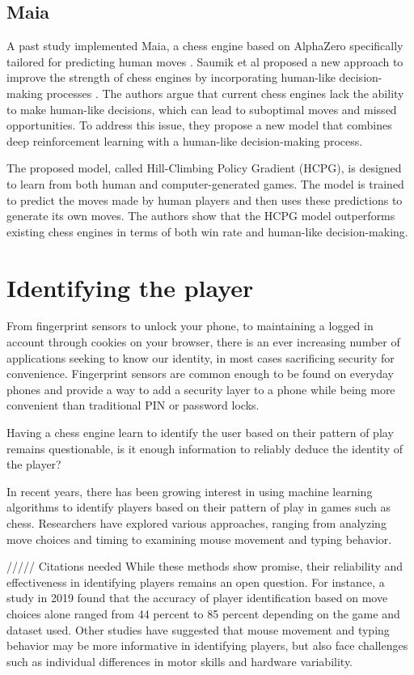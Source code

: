 \begin{spacing}{2.0}
\subsection{Maia}

A past study implemented Maia, a chess engine based on AlphaZero specifically tailored for predicting human moves \cite{SuperAI}. Saumik et al proposed a new approach to improve the strength of chess engines by incorporating human-like decision-making processes \cite{maia}. The authors argue that current chess engines lack the ability to make human-like decisions, which can lead to suboptimal moves and missed opportunities. To address this issue, they propose a new model that combines deep reinforcement learning with a human-like decision-making process.

The proposed model, called Hill-Climbing Policy Gradient (HCPG), is designed to learn from both human and computer-generated games. The model is trained to predict the moves made by human players and then uses these predictions to generate its own moves. The authors show that the HCPG model outperforms existing chess engines in terms of both win rate and human-like decision-making.

\section{Identifying the player}

From fingerprint sensors to unlock your phone, to maintaining a logged in account through cookies on your browser, there is an ever increasing number of applications seeking to know our identity, in most cases sacrificing security for convenience. Fingerprint sensors are common enough to be found on everyday phones \cite{fingerprint} and provide a way to add a security layer to a phone while being more convenient than traditional PIN or password locks. 

Having a chess engine learn to identify the user based on their pattern of play remains questionable, is it enough information to reliably deduce the identity of the player?

In recent years, there has been growing interest in using machine learning algorithms to identify players based on their pattern of play in games such as chess. Researchers have explored various approaches, ranging from analyzing move choices and timing to examining mouse movement and typing behavior.


///// Citations needed
While these methods show promise, their reliability and effectiveness in identifying players remains an open question. For instance, a study in 2019 found that the accuracy of player identification based on move choices alone ranged from 44 percent to 85 percent depending on the game and dataset used. Other studies have suggested that mouse movement and typing behavior may be more informative in identifying players, but also face challenges such as individual differences in motor skills and hardware variability.


\end{spacing}
